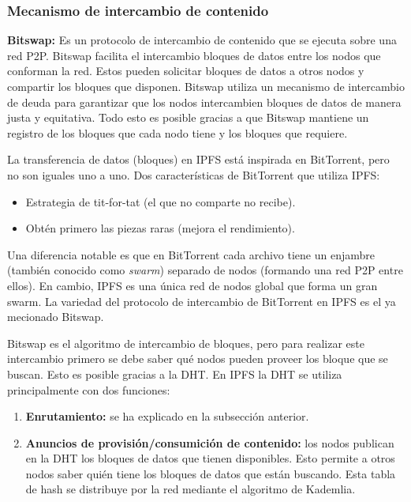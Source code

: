 \subsubsection{Mecanismo de intercambio de contenido}

\textbf{Bitswap:} Es un protocolo de intercambio de contenido que se ejecuta sobre una red P2P. Bitswap facilita el intercambio bloques de datos entre los nodos que conforman la red. Estos pueden solicitar bloques de datos a otros nodos y compartir los bloques que disponen. Bitswap utiliza un mecanismo de intercambio de deuda para
garantizar que los nodos intercambien bloques de datos de manera justa y equitativa.
Todo esto es posible gracias a que Bitswap mantiene un registro de los bloques que cada nodo tiene y los bloques que requiere.

La transferencia de datos (bloques) en IPFS está inspirada en BitTorrent, pero no son iguales uno a uno. Dos características de BitTorrent que utiliza IPFS:
\begin{itemize}[itemsep=1pt,nolistsep]
      \item Estrategia de tit-for-tat (el que no comparte no recibe).
      \item Obtén primero las piezas raras (mejora el rendimiento).
\end{itemize}
Una diferencia notable es que en BitTorrent cada archivo tiene un enjambre (también conocido como \textit{swarm}) separado de nodos (formando una red P2P entre ellos). En cambio, IPFS es una única red de nodos global que forma un gran swarm. La variedad del protocolo de intercambio de BitTorrent en IPFS es el ya mecionado Bitswap.

Bitswap es el algoritmo de intercambio de bloques, pero para realizar este intercambio primero se debe saber qué nodos pueden proveer los bloque que se buscan.
Esto es posible gracias a la DHT. En IPFS la DHT se utiliza principalmente con dos funciones:
\begin{enumerate}
      \item \textbf{Enrutamiento:} se ha explicado en la subsección anterior.
      \item \textbf{Anuncios de provisión/consumición de contenido:} los nodos publican en la DHT los bloques de datos que tienen disponibles. Esto permite a otros nodos saber quién tiene los bloques de datos que están buscando. Esta tabla de hash se distribuye por la red mediante el algoritmo de Kademlia.
\end{enumerate}

